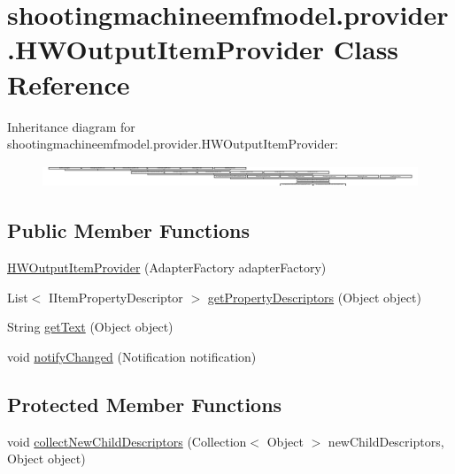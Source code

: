 \hypertarget{classshootingmachineemfmodel_1_1provider_1_1_h_w_output_item_provider}{\section{shootingmachineemfmodel.\-provider.\-H\-W\-Output\-Item\-Provider Class Reference}
\label{classshootingmachineemfmodel_1_1provider_1_1_h_w_output_item_provider}
}
Inheritance diagram for shootingmachineemfmodel.\-provider.\-H\-W\-Output\-Item\-Provider\-:\begin{figure}[H]
\begin{center}
\leavevmode
\includegraphics[height=0.680603cm]{classshootingmachineemfmodel_1_1provider_1_1_h_w_output_item_provider}
\end{center}
\end{figure}
\subsection*{Public Member Functions}
\begin{DoxyCompactItemize}
\item 
\hyperlink{classshootingmachineemfmodel_1_1provider_1_1_h_w_output_item_provider_a1a86e979fe79b7bd942995a0cf77f30f}{H\-W\-Output\-Item\-Provider} (Adapter\-Factory adapter\-Factory)
\item 
List$<$ I\-Item\-Property\-Descriptor $>$ \hyperlink{classshootingmachineemfmodel_1_1provider_1_1_h_w_output_item_provider_a2b7e2e30981903500ab8ae01688733b0}{get\-Property\-Descriptors} (Object object)
\item 
String \hyperlink{classshootingmachineemfmodel_1_1provider_1_1_h_w_output_item_provider_adda44f3e31d2411d393a856c4040a947}{get\-Text} (Object object)
\item 
void \hyperlink{classshootingmachineemfmodel_1_1provider_1_1_h_w_output_item_provider_a27f8b81e5ba996668b0c33a1b17e5042}{notify\-Changed} (Notification notification)
\end{DoxyCompactItemize}
\subsection*{Protected Member Functions}
\begin{DoxyCompactItemize}
\item 
void \hyperlink{classshootingmachineemfmodel_1_1provider_1_1_h_w_output_item_provider_ad09b3fb380e6b96a176e9de0c02946df}{collect\-New\-Child\-Descriptors} (Collection$<$ Object $>$ new\-Child\-Descriptors, Object object)
\end{DoxyCompactItemize}


